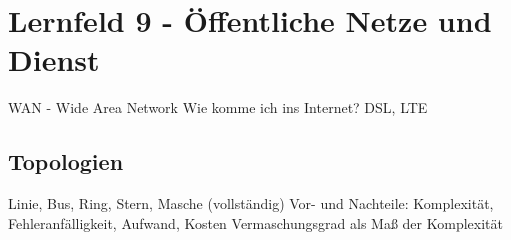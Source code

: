 \section{Lernfeld 9 - Öffentliche Netze und Dienst}

WAN - Wide Area Network
Wie komme ich ins Internet?
DSL, LTE

\subsection{Topologien}

Linie, Bus, Ring, Stern, Masche (vollständig)
Vor- und Nachteile: Komplexität, Fehleranfälligkeit, Aufwand, Kosten
Vermaschungsgrad als Maß der Komplexität

